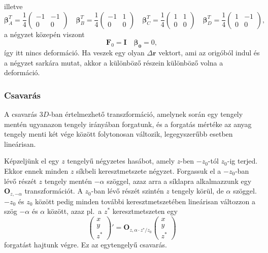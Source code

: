 \documentclass[12pt,a4paper]{scrartcl}
\let\mathbf\bm
\begin{document}
illetve
\[{\mathbf{\beta }}_A^T = \frac{1}{4}\left( {\begin{array}{*{20}{c}}
  { - 1}&{ - 1} \\ 
  0&0 
\end{array}} \right)\quad {\mathbf{\beta }}_B^T = \frac{1}{4}\left( {\begin{array}{*{20}{c}}
  { - 1}&1 \\ 
  0&0 
\end{array}} \right)\quad {\mathbf{\beta }}_C^T = \frac{1}{4}\left( {\begin{array}{*{20}{c}}
  1&1 \\ 
  0&0 
\end{array}} \right)\quad {\mathbf{\beta }}_D^T = \frac{1}{4}\left( {\begin{array}{*{20}{c}}
  1&{ - 1} \\ 
  0&0 
\end{array}} \right),\]
a négyzet közepén viszont \[{{\mathbf{F}}_0} = {\mathbf{I}}\quad {\mathbf{\beta_0 }} = 0,\]
így itt nincs deformáció. Ha veszek egy olyan $\Delta {\mathbf{r}}$ vektort, ami az origóból indul és a négyzet sarkára mutat, akkor a különböző részein különböző volna a deformáció.
\normalsize

\subsubsection{Csavarás}
A csavarás $3D$-ban értelmezhető transzformáció, amelynek során egy tengely mentén ugyanazon tengely irányában forgatunk, és a forgatás mértéke az anyag tengely menti két vége között folytonosan változik, legegyszerűbb esetben lineárisan.

Képzeljünk el egy $z$ tengelyű négyzetes hasábot, amely $z$-ben $-z_0$-tól $z_0$-ig terjed. Ekkor ennek minden $z$ síkbeli keresztmetszete négyzet. Forgassuk el a $-z_0$-ban lévő részét $z$ tengely mentén $-\alpha$ szöggel, azaz arra a síklapra alkalmazzunk egy ${{\mathbf{O}}_{z, - \alpha }}$ transzformációt. A $z_0$-ban lévő részét szintén $z$ tengely körül, de $\alpha$ szöggel. $-z_0$ és $z_0$ között pedig minden további keresztmetszetében lineárisan változzon a szög $-\alpha$ és $\alpha$ között, azaz pl.\ a $z^*$ keresztmetszeten egy 
\begin{equation}
\left( {\begin{array}{*{20}{c}}
  x \\ 
  y \\ 
  {{z^ * }} 
\end{array}} \right)' = {{\mathbf{O}}_{z,\alpha  \cdot {z^ * }/z_0}} \left( {\begin{array}{*{20}{c}}
  x \\ 
  y \\ 
  {{z^ * }} 
\end{array}} \right)
\end{equation}
forgatást hajtunk végre. Ez az egytengelyű csavarás.
\end{document}
